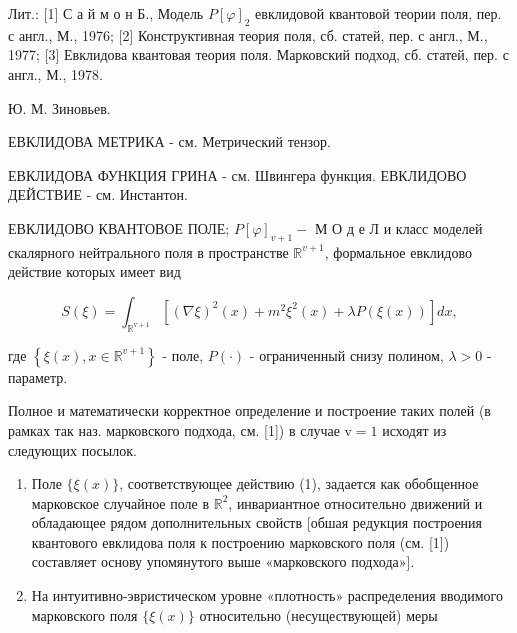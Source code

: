 \documentclass[10pt]{article}
\begin{document}
Лит.: [1] С а й м о н Б., Модель $P[\varphi]_{2}$ евклидовой квантовой теории поля, пер. с англ., М., 1976; [2] Конструктивная теория поля, сб. статей, пер. с англ., М., 1977; [3] Евклидова квантовая теория поля. Марковский подход, сб. статей, пер. с англ., М., 1978.



Ю. М. Зиновьев.



ЕВКЛИДОВА МЕТРИКА - см. Метрический тензор.



ЕВКЛИДОВА ФУНКЦИЯ ГРИНА - см. Швингера функция. ЕВКЛИДОВО ДЕЙСТВИЕ - см. Инстантон.



ЕВКЛИДОВО КВАНТОВОЕ ПОЛЕ; $P[\varphi]_{v+1}-$ М О д е Л и класс моделей скалярного нейтрального поля в пространстве $\mathbb{R}^{v+1}$, формальное евклидово действие которых имеет вид



\[

S(\xi)=\int_{\mathbb{R}^{\mathrm{v}+1}}\left[(\nabla \xi)^{2}(x)+m^{2} \xi^{2}(x)+\lambda P(\xi(x))\right] d x,

\]



где $\left\{\xi(x), x \in \mathbb{R}^{v+1}\right\}$ - поле, $P(\cdot)$ - ограниченный снизу полином, $\lambda>0$ - параметр.



Полное и математически корректное определение и построение таких полей (в рамках так наз. марковского подхода, см. [1]) в случае $\mathrm{v}=1$ исходят из следующих посылок.



\begin{enumerate}

  \item Поле $\{\xi(x)\}$, соответствующее действию (1), задается как обобщенное марковское случайное поле в $\mathbb{R}^{2}$, инвариантное относительно движений и обладающее рядом дополнительных свойств [обшая редукция построения квантового евклидова поля к построению марковского поля (см. [1]) составляет основу упомянутого выше «марковского подхода»].



  \item На интуитивно-эвристическом уровне «плотность» распределения вводимого марковского поля $\{\xi(x)\}$ относительно (несуществующей) меры



\end{enumerate}
\end{document}
